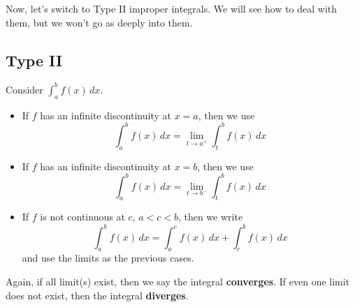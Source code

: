 Now, let's switch to Type II improper integrals. We will see how to deal with them, but we won't
go as deeply into them.

\subsection*{Type II}
Consider $ \displaystyle \int_{a}^{b} f(x)\, d{x}  $.
\begin{itemize}
    \item If $ f $ has an infinite discontinuity at $ x=a $, then we use
          \[ \int_{a}^{b} f(x)\, d{x} =\lim\limits_{{t} \to {a^+}} \int_{t}^{b} f(x)\, d{x} \]
    \item If $ f $ has an infinite discontinuity at $ x=b $, then we use
          \[ \int_{a}^{b} f(x)\, d{x} =\lim\limits_{{t} \to {b^-}} \int_{t}^{b} f(x)\, d{x} \]
    \item If $ f $ is not continuous at $ c $, $ a<c<b $, then we write
          \[  \int_{a}^{b} f(x)\, d{x} =\int_{a}^{c} f(x)\, d{x} +\int_{c}^{b} f(x)\, d{x} \]
          and use the limits as the previous cases.
\end{itemize}
Again, if all limit(s) exist, then we say the integral \textbf{converges}. If even one
limit does not exist, then the integral \textbf{diverges}.

